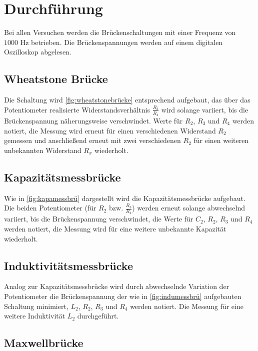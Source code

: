 \section{Durchführung}
\label{sec:Durchführung}

Bei allen Versuchen werden die Brückenschaltungen mit einer Frequenz von $1000 \, \, \unit{\hertz}$ betrieben.
Die Brückenspannungen werden auf einem digitalen Oszilloskop abgelesen.

\subsection{Wheatstone Brücke}

Die Schaltung wird \autoref{fig:wheatstonebrücke} entsprechend aufgebaut, das über das Potentiometer
realisierte Widerstandsverhältnis $\frac{R_3}{R_4}$ wird solange variiert, bis die Brückenspannung 
näherungsweise verschwindet.
Werte für $R_2$, $R_3$ und $R_4$ werden notiert, die Messung wird erneut für einen verschiedenen 
Widerstand $R_2$ gemessen und anschließend erneut mit zwei verschiedenen $R_2$ für einen weiteren 
unbekannten Widerstand $R_x$ wiederholt.


\subsection{Kapazitätsmessbrücke}

Wie in \autoref{fig:kapamessbrü} dargestellt wird die Kapazitätsmessbrücke aufgebaut.
Die beiden Potentiometer (für $R_2$ bzw. $\frac{R_3}{R_4}$) werden erneut solange abwechselnd variiert, 
bis die Brückenspannung verschwindet, die Werte für $C_2$, $R_2$, $R_3$ und $R_4$ werden notiert, die Messung
wird für eine weitere unbekannte Kapazität wiederholt.


\subsection{Induktivitätsmessbrücke}
\label{subsec:indumessdurch}

Analog zur Kapazitätsmessbrücke wird durch abwechselnde Variation der Potentiometer die Brückenspannung
der wie in \autoref{fig:indumessbrü} aufgebauten Schaltung minimiert, $L_2$, $R_2$, $R_3$ und $R_4$ 
werden notiert.
Die Messung für eine weitere Induktivität $L_2$ durchgeführt.


\subsection{Maxwellbrücke}

